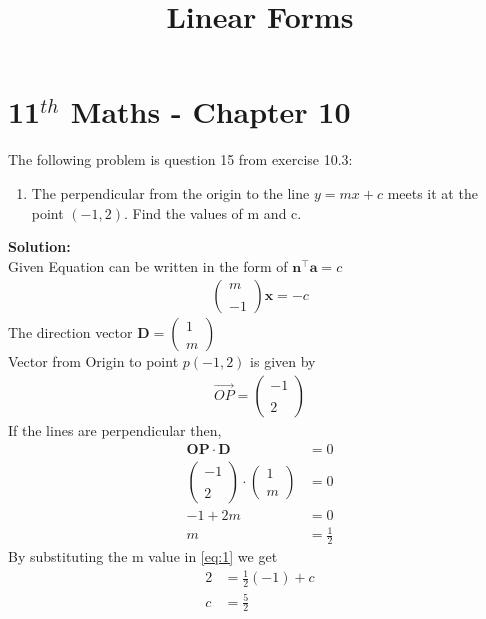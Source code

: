 \documentclass[12pt]{article}
\newcommand{\solution}{\noindent \textbf{Solution: }}
\newcommand{\myvec}[1]{\ensuremath{\begin{pmatrix}#1\end{pmatrix}}}
\let\vec\mathbf
\begin{document}
\graphicspath{{./Documents}{./figs}}
\begin{center}
  \title{\textbf{Linear Forms}}
  \date{\vspace{-5ex}}
  \maketitle
\end{center}
\setcounter{page}{1}
\section*{11$ ^{th} $ Maths - Chapter 10}
The following problem is question 15 from exercise 10.3:
\begin{enumerate}
\item The perpendicular from the origin to the line $y=mx+c$ meets it at the point $(-1,2)$. Find the values of m and c.
\end{enumerate}
\solution \\
    Given Equation can be written in the form of $\vec{n}^\top{}\vec{a}=c$
    \begin{align} 
    \myvec{m \\ \\ -1}\vec{x}=-c
     \label{eq:1}
    \end{align}
    The direction vector $\vec{D} = \myvec{1\\ \\ m}$\\
    Vector from Origin to point $p(-1,2)$ is given by
    \begin{align}
    \Vec{OP}=
  \begin{pmatrix}
             -1\\ \\ 2
 \end{pmatrix}
 \end{align}
 If the lines are perpendicular then,
 \begin{align}
	 \vec{OP}\cdot\vec{D} &= 0\\
	 \myvec{-1 \\ \\ 2}\cdot\myvec{1 \\ \\ m}&=0\\
	 -1 + 2m &= 0\\
	 m &= \frac{1}{2}
\end{align}
By substituting the m value in \eqref{eq:1}  we get
 \begin{align}
 2 &=\frac{1}{2} (-1) + c \\
 c &=\frac{5}{2}  
\end{align}
\end{document}
